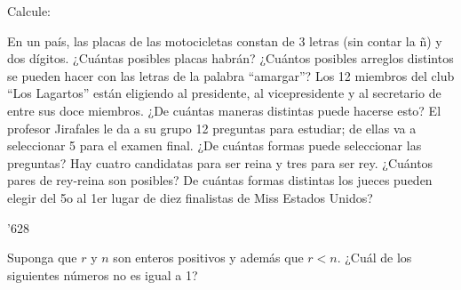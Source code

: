 \documentclass[10pt,addpoints]{exam}
\begin{document}
\begin{questions}
\question Calcule:
\begin{parts}
\end{parts}
\vspace*{.5in}
\question En un país, las placas de las motocicletas constan de 3 letras (sin contar la ñ) y dos dígitos. ¿Cuántas posibles placas habrán?\vspace*{.5in}
\question ¿Cuántos posibles arreglos distintos se pueden hacer con las letras de la palabra ``amargar''?\vspace*{.5in}
\question Los 12 miembros del club ``Los Lagartos'' están eligiendo al presidente, al vicepresidente y al secretario de entre sus doce miembros. ¿De cuántas maneras distintas puede hacerse esto?\vspace*{.5in}
\question El profesor Jirafales le da a su grupo 12 preguntas para estudiar; de ellas va a seleccionar 5 para el examen final. ¿De cuántas formas puede seleccionar las preguntas?\vspace*{.5in}
\question Hay cuatro candidatas para ser reina y tres para ser rey. ¿Cuántos pares de rey-reina son posibles?\vspace*{.5in}
\question De cuántas formas distintas los jueces pueden elegir del 5o al 1er lugar de diez finalistas de Miss Estados Unidos?

\begin{oneparchoices}
'628
\end{oneparchoices}
\question Suponga que $r$ y $n$ son enteros positivos y además que $r< n$. ¿Cuál de los siguientes números no es igual a 1?


\end{questions}
\end{document}
